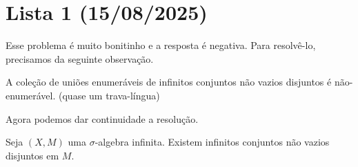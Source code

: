 \section{Lista 1 (15/08/2025)}

\prob
Esse problema é muito bonitinho e a resposta é negativa. Para resolvê-lo, precisamos da seguinte observação.
\begin{observation}
    A coleção de uniões enumeráveis de infinitos conjuntos não vazios disjuntos é não-enumerável. (quase um trava-língua)
\end{observation}
Agora podemos dar continuidade a resolução.
\begin{prop}
    Seja $(X,M)$ uma $\sigma$-algebra infinita. Existem infinitos conjuntos não vazios disjuntos em $M$.
\end{prop}

